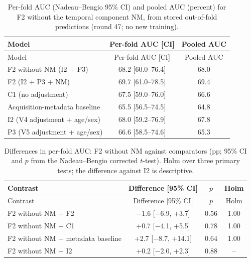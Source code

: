 {\scriptsize
\begin{longtable}{lcc}
\caption{Per-fold AUC (Nadeau--Bengio 95\% CI) and pooled AUC (percent) for F2 without the temporal component NM, from stored out-of-fold predictions (round 47; no new training).}\label{tab:s2_p47a}\\
\toprule
Model & Per-fold AUC [CI] & Pooled AUC \\
\midrule
\endfirsthead
\toprule
Model & Per-fold AUC [CI] & Pooled AUC \\
\midrule
\endhead
\bottomrule
\endfoot
F2 without NM (I2 + P3) & 68.2 [60.0--76.4] & 68.0 \\
F2 (I2 + P3 + NM) & 69.7 [61.0--78.5] & 69.4 \\
C1 (no adjustment) & 67.5 [59.0--76.0] & 66.6 \\
Acquisition-metadata baseline & 65.5 [56.5--74.5] & 64.8 \\
I2 (V4 adjustment + age/sex) & 68.0 [59.2--76.9] & 67.8 \\
P3 (V5 adjustment + age/sex) & 66.6 [58.5--74.6] & 65.3 \\
\end{longtable}
}

{\scriptsize
\begin{longtable}{lccc}
\caption{Differences in per-fold AUC: F2 without NM against comparators (pp; 95\% CI and $p$ from the Nadeau--Bengio corrected $t$-test). Holm over three primary tests; the difference against I2 is descriptive.}\label{tab:s2_p47b}\\
\toprule
Contrast & Difference [95\% CI] & $p$ & Holm \\
\midrule
\endfirsthead
\toprule
Contrast & Difference [95\% CI] & $p$ & Holm \\
\midrule
\endhead
\bottomrule
\endfoot
F2 without NM $-$ F2 & $-$1.6 [$-$6.9, +3.7] & 0.56 & 1.00 \\
F2 without NM $-$ C1 & +0.7 [$-$4.1, +5.5] & 0.78 & 1.00 \\
F2 without NM $-$ metadata baseline & +2.7 [$-$8.7, +14.1] & 0.64 & 1.00 \\
F2 without NM $-$ I2 & +0.2 [$-$2.0, +2.3] & 0.88 & -- \\
\end{longtable}
}
